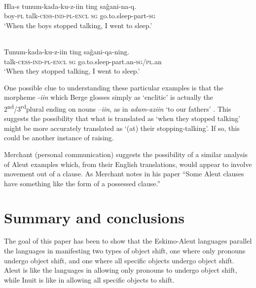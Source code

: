 \documentclass[output=paper]{LSP/langsci}
\begin{document}
\ea\label{ex:woolford:46}
\\
\gll Hla-s  tunum-kada-ku-z-iin   ting   sa\^{g}ani-na-q.         \\
     boy-\textsc{pl}  talk-\textsc{cess}-\textsc{ind}-\textsc{pl}-\textsc{encl}   \textsc{sg}   go.to.sleep-part-\textsc{sg}  \\
\glt ‘When the boys stopped talking, I went to sleep.’
\z

\ea\label{ex:woolford:47}
\\
\gll  Tunum-kada-ku-z-iin   ting  sa\^{g}ani-qa-ning.           \\
     talk-\textsc{cess}-\textsc{ind}-\textsc{pl}-\textsc{encl}  \textsc{sg}  go.to.sleep-part.an-\textsc{sg}/\textsc{pl}.an \\
\glt ‘When they stopped talking, I went to sleep.’
\z

One possible clue to understanding these particular examples is that the morpheme -\textit{iin} which Berge glosses simply as ‘enclitic’ is actually the 2\textsuperscript{nd}/3\textsuperscript{rd}plural  ending on nouns –\textit{iin}, as in \textit{adam-aziin} ‘to our fathers’ \citep[149]{bergsland1997aleut}. This suggests the possibility that what is translated as ‘when they stopped talking’ might be more accurately translated as ‘(at) their stopping-talking’. If so, this could be another instance of  raising.

Merchant (personal communication) suggests the possibility of a similar analysis of Aleut examples which, from their English translations, would appear to involve movement out of a  clause. As Merchant notes in his \citeyear{merchant2011aleut} paper ``Some Aleut  clauses have something like the form of a possessed clause.'' \citep[397]{merchant2011aleut}

\section{Summary and conclusions}\label{sec:woolford:6}


The goal of this paper has been to show that the Eskimo-Aleut languages parallel the  languages in manifesting two types of object shift, one where only pronouns undergo object shift, and one where all specific objects undergo object shift. Aleut is like the  languages in allowing only pronouns to undergo object shift, while Inuit is like  in allowing all specific objects to shift.
\end{document}

